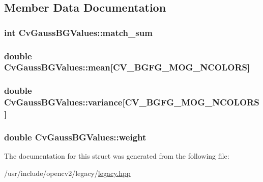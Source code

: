 \subsection{Member Data Documentation}
\hypertarget{structCvGaussBGValues_a0ead7e4f776366c5746e0d2614491a3c}{
\subsubsection[{match\-\_\-sum}]{\setlength{\rightskip}{0pt plus 5cm}int Cv\-Gauss\-B\-G\-Values\-::match\-\_\-sum}}\label{structCvGaussBGValues_a0ead7e4f776366c5746e0d2614491a3c}
\hypertarget{structCvGaussBGValues_a1a89e405a3b88c3776d56c8fb45b810c}{
\subsubsection[{mean}]{\setlength{\rightskip}{0pt plus 5cm}double Cv\-Gauss\-B\-G\-Values\-::mean\mbox{[}{\bf C\-V\-\_\-\-B\-G\-F\-G\-\_\-\-M\-O\-G\-\_\-\-N\-C\-O\-L\-O\-R\-S}\mbox{]}}}\label{structCvGaussBGValues_a1a89e405a3b88c3776d56c8fb45b810c}
\hypertarget{structCvGaussBGValues_ad70a97c35dda441899e98c84f94f3a71}{
\subsubsection[{variance}]{\setlength{\rightskip}{0pt plus 5cm}double Cv\-Gauss\-B\-G\-Values\-::variance\mbox{[}{\bf C\-V\-\_\-\-B\-G\-F\-G\-\_\-\-M\-O\-G\-\_\-\-N\-C\-O\-L\-O\-R\-S}\mbox{]}}}\label{structCvGaussBGValues_ad70a97c35dda441899e98c84f94f3a71}
\hypertarget{structCvGaussBGValues_a123de53e18b5254ec6557ddc542b1b42}{
\subsubsection[{weight}]{\setlength{\rightskip}{0pt plus 5cm}double Cv\-Gauss\-B\-G\-Values\-::weight}}\label{structCvGaussBGValues_a123de53e18b5254ec6557ddc542b1b42}


The documentation for this struct was generated from the following file\-:\begin{DoxyCompactItemize}
\item 
/usr/include/opencv2/legacy/\hyperlink{legacy_8hpp}{legacy.\-hpp}\end{DoxyCompactItemize}
